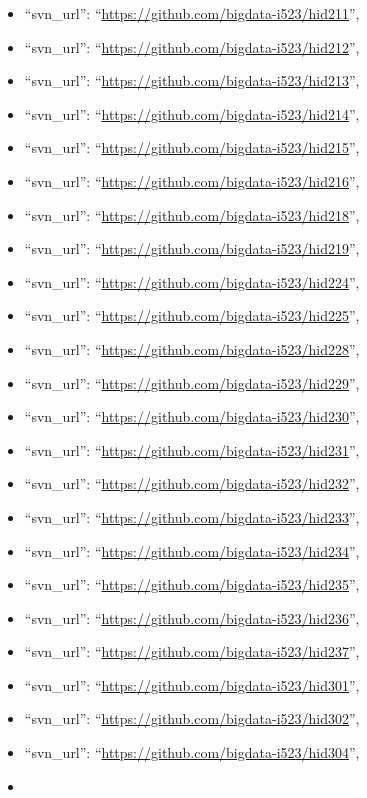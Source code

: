 \begin{itemize}
\item
  ``svn\_url'': ``\url{https://github.com/bigdata-i523/hid211}'',
\item
  ``svn\_url'': ``\url{https://github.com/bigdata-i523/hid212}'',
\item
  ``svn\_url'': ``\url{https://github.com/bigdata-i523/hid213}'',
\item
  ``svn\_url'': ``\url{https://github.com/bigdata-i523/hid214}'',
\item
  ``svn\_url'': ``\url{https://github.com/bigdata-i523/hid215}'',
\item
  ``svn\_url'': ``\url{https://github.com/bigdata-i523/hid216}'',
\item
  ``svn\_url'': ``\url{https://github.com/bigdata-i523/hid218}'',
\item
  ``svn\_url'': ``\url{https://github.com/bigdata-i523/hid219}'',
\item
  ``svn\_url'': ``\url{https://github.com/bigdata-i523/hid224}'',
\item
  ``svn\_url'': ``\url{https://github.com/bigdata-i523/hid225}'',
\item
  ``svn\_url'': ``\url{https://github.com/bigdata-i523/hid228}'',
\item
  ``svn\_url'': ``\url{https://github.com/bigdata-i523/hid229}'',
\item
  ``svn\_url'': ``\url{https://github.com/bigdata-i523/hid230}'',
\item
  ``svn\_url'': ``\url{https://github.com/bigdata-i523/hid231}'',
\item
  ``svn\_url'': ``\url{https://github.com/bigdata-i523/hid232}'',
\item
  ``svn\_url'': ``\url{https://github.com/bigdata-i523/hid233}'',
\item
  ``svn\_url'': ``\url{https://github.com/bigdata-i523/hid234}'',
\item
  ``svn\_url'': ``\url{https://github.com/bigdata-i523/hid235}'',
\item
  ``svn\_url'': ``\url{https://github.com/bigdata-i523/hid236}'',
\item
  ``svn\_url'': ``\url{https://github.com/bigdata-i523/hid237}'',
\item
  ``svn\_url'': ``\url{https://github.com/bigdata-i523/hid301}'',
\item
  ``svn\_url'': ``\url{https://github.com/bigdata-i523/hid302}'',
\item
  ``svn\_url'': ``\url{https://github.com/bigdata-i523/hid304}'',
\item

\end{itemize}
